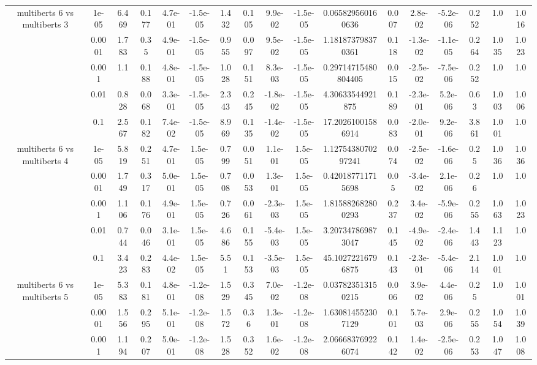 \begin{tabular}{|c|c|c|c|c|c|c|c|c|c|c|c|c|c|c|c|c|}
\hline
\multirow{5}{*}{multiberts 6 vs multiberts 3} & 1e-05 & 6.469 & 0.177 & 4.7e-01 & -1.5e-05 & 1.432 & 0.105 & 9.9e-02 & -1.5e-05 & 0.065829560160636 & 0.007 & 2.8e-02 & -5.2e-06 & 0.252 & 1.0 & 1.016 \\
 & 0.0001 & 1.783 & 0.35 & 4.9e-01 & -1.5e-05 & 0.955 & 0.097 & 9.5e-02 & -1.5e-05 & 1.181873798370361 & 0.118 & -1.3e-02 & -1.1e-05 & 0.264 & 1.035 & 1.023 \\
 & 0.001 & 1.1 & 0.188 & 4.8e-01 & -1.5e-05 & 1.028 & 0.151 & 8.3e-03 & -1.5e-05 & 0.29714715480804405 & 0.015 & -2.5e-02 & -7.5e-06 & 0.252 & 1.0 & 1.0 \\
 & 0.01 & 0.828 & 0.068 & 3.3e-01 & -1.5e-05 & 2.343 & 0.245 & -1.8e-02 & -1.5e-05 & 4.30633544921875 & 0.189 & -2.3e-01 & 5.2e-06 & 0.63 & 1.003 & 1.006 \\
 & 0.1 & 2.567 & 0.182 & 7.4e-02 & -1.5e-05 & 8.969 & 0.135 & -1.4e-02 & -1.5e-05 & 17.20261001586914 & 0.083 & -2.0e-01 & 9.2e-06 & 3.861 & 1.001 & 1.0 \\
\hline
\multirow{5}{*}{multiberts 6 vs multiberts 4} & 1e-05 & 5.819 & 0.251 & 4.7e-01 & 1.5e-05 & 0.799 & 0.051 & 1.1e-01 & 1.5e-05 & 1.1275438070297241 & 0.074 & -2.5e-02 & -1.6e-06 & 0.25 & 1.036 & 1.036 \\
 & 0.0001 & 1.749 & 0.317 & 5.0e-01 & 1.5e-05 & 0.708 & 0.053 & 1.3e-01 & 1.5e-05 & 0.420187711715698 & 0.05 & -3.4e-02 & 2.1e-06 & 0.26 & 1.0 & 1.0 \\
 & 0.001 & 1.106 & 0.176 & 4.9e-01 & 1.5e-05 & 0.726 & 0.061 & -2.3e-03 & 1.5e-05 & 1.815882682800293 & 0.237 & 3.4e-02 & -5.9e-06 & 0.255 & 1.063 & 1.023 \\
 & 0.01 & 0.744 & 0.046 & 3.1e-01 & 1.5e-05 & 4.686 & 0.155 & -5.4e-03 & 1.5e-05 & 3.207347869873047 & 0.145 & -4.9e-02 & -2.4e-06 & 1.443 & 1.123 & 1.0 \\
 & 0.1 & 3.423 & 0.283 & 4.4e-02 & 1.5e-05 & 5.51 & 0.153 & -3.5e-03 & 1.5e-05 & 45.10272216796875 & 0.143 & -2.3e-01 & -5.4e-06 & 2.114 & 1.001 & 1.0 \\
\hline
\multirow{5}{*}{multiberts 6 vs multiberts 5} & 1e-05 & 5.383 & 0.181 & 4.8e-01 & -1.2e-08 & 1.529 & 0.345 & 7.0e-02 & -1.2e-08 & 0.037823513150215 & 0.006 & 3.9e-02 & 4.4e-06 & 0.25 & 1.0 & 1.001 \\
 & 0.0001 & 1.556 & 0.295 & 5.1e-01 & -1.2e-08 & 1.572 & 0.36 & 1.3e-01 & -1.2e-08 & 1.630814552307129 & 0.101 & 5.7e-03 & 2.9e-06 & 0.255 & 1.054 & 1.039 \\
 & 0.001 & 1.194 & 0.207 & 5.0e-01 & -1.2e-08 & 1.528 & 0.352 & 1.6e-02 & -1.2e-08 & 2.066683769226074 & 0.142 & 1.4e-02 & -2.5e-06 & 0.253 & 1.047 & 1.008 \\

\end{tabular}
